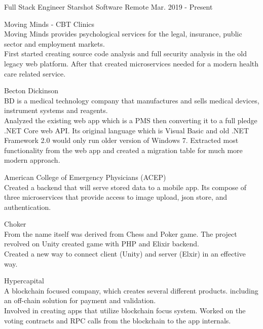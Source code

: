 
\begin{cventries}
    \cventry
        {Full Stack Engineer}
        {Starshot Software}
        {Remote}
        {Mar. 2019 - Present}
        {
            \begin{cvitems}
                \item
                    {Moving Minds - CBT Clinics\\
                    Moving Minds provides psychological services for the legal, insurance, public sector and employment markets.\\
                    First started creating source code analysis and full security analysis in the old legacy web platform. After that created microservices needed for a modern health care related service.}
                \item
                    {Becton Dickinson\\
                    BD is a medical technology company that manufactures and sells medical devices, instrument systems and reagents.\\
                    Analyzed the existing web app which is a PMS then converting it to a full pledge .NET Core web API. Its original language which is Visual Basic and old .NET Framework 2.0 would only run older version of Windows 7. Extracted most functionality from the web app and created a migration table for much more modern approach.}
                \item
                    {American College of Emergency Physicians (ACEP)\\
                    Created a backend that will serve stored data to a mobile app. Its compose of three microservices that provide access to image upload, json store, and authentication.}
                \item
                    {Choker\\
                    From the name itself was derived from Chess and Poker game. The project revolved on Unity created game with PHP and Elixir backend.\\
                    Created a new way to connect client (Unity) and server (Elxir) in an effective way.}
                \item
                    {Hypercapital\\
                    A blockchain focused company, which creates several different products. including an off-chain solution for payment and validation.\\
                    Involved in creating apps that utilize blockchain focus system. Worked on the voting contracts and RPC calls from the blockchain to the app internals.}
            \end{cvitems}        
        }
        

\end{cventries}
